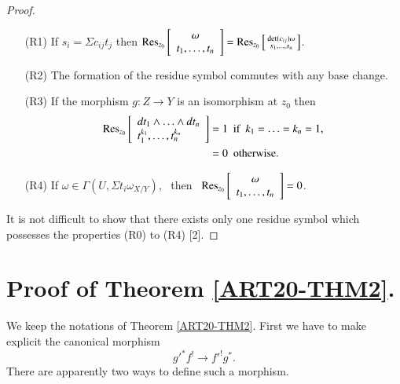 \begin{proof}
\begin{itemize}
\item[(R1)] If $s_{i}=\Sigma c_{ij}t_{j}$ then $\operatorname{\mathrm{Res}}_{z_{0}}\left[\begin{array}{c} \omega\\ t_{1},\ldots,t_{n}
\end{array}\right]=\operatorname{\mathrm{Res}}_{z_{0}}\left[\begin{smallmatrix} \det(c_{ij})\omega\\ s_{1},\ldots,s_{n}\end{smallmatrix}\right]$.

\item[(R2)] The formation of the residue symbol commutes with any base change.

\item[(R3)] If the morphism $g:Z\to Y$ is an isomorphism at $z_{0}$ then 
\begin{align*}
\operatorname{\mathrm{Res}}_{z_{0}}\left[\begin{array}{l} dt_{1}\wedge\ldots\wedge dt_{n}\\ t^{k_{1}}_{1},\ldots,t^{k_{n}}_{n}\end{array}\right] &= 1\text{~ if~ } k_{1}=\ldots=k_{n}=1,\\
&= 0\text{~ otherwise.}
\end{align*}

\item[(R4)] If $\omega\in \Gamma(U,\Sigma t_{i}\omega_{X/Y})$, \ then \ $\operatorname{\mathrm{Res}}_{z_{0}}\left[\begin{array}{c} \omega\\ t_{1},\ldots,t_{n}\end{array}\right]=0$.
\end{itemize}

It is not difficult to show that there exists only one residue symbol which possesses the properties (R0) to (R4) [2].
\end{proof}

\setcounter{section}{2}
\section{Proof of Theorem \ref{ART20-THM2}.}\label{art20-sec3}

We keep the notations of Theorem \ref{ART20-THM2}. First we have to make explicit the canonical morphism
$$
{g'}^{*}f^{!}\to {f'}^{!}g^{*}.
$$
There are apparently two ways to define such a morphism.

